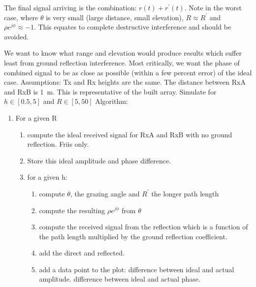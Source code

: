 The final signal arriving is the combination: \(r(t) + r^\prime(t)\).
Note in the worst case, where \(\theta\) is very small (large distance, small elevation), \(R \approx R^\prime\) and \(\rho e^{j\phi} \approx -1\). This equates to complete destructive interference and should be avoided.

We want to know what range and elevation would produce results which suffer least from ground reflection interference. Most critically, we want the phase of combined signal to be as close as possible (within a few percent error) of the ideal case. 
Assumptions: Tx and Rx heights are the same. The distance between RxA and RxB is \SI{1}{\meter}. This is representative of the built array. Simulate for \(h \in \left[ 0.5 , 5 \right]\) and \(R \in \left[5, 50\right]\)
Algorithm:
\begin{enumerate}
  \item For a given R
    \begin{enumerate}
      \item compute the ideal received signal for RxA and RxB with no ground reflection. Friis only.
      \item Store this ideal amplitude and phase difference.
      \item for a given h:
        \begin{enumerate}
          \item compute \(\theta\), the grazing angle and \(R^\prime\) the longer path length
          \item compute the resulting \(\rho e^{j\phi}\) from \(\theta\)
          \item compute the received signal from the reflection which is a function of the path length multiplied by the ground reflection coefficient. 
          \item add the direct and reflected.
          \item add a data point to the plot: difference between ideal and actual amplitude. difference between ideal and actual phase.
        \end{enumerate}
    \end{enumerate}
\end{enumerate}

